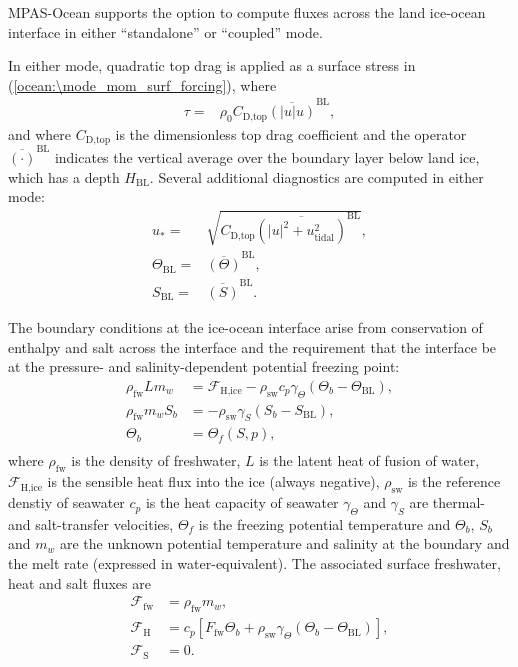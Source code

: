 MPAS-Ocean supports the option to compute fluxes across
the land ice-ocean interface in either ``standalone'' or ``coupled''
mode.

In either mode, quadratic top drag is applied as a surface stress
in (\ref{ocean:\mode_mom_surf_forcing}), where
\begin{align}
\tau = & \rho_0 C_\textrm{D,top} \overline{\left(|u| u\right)}^\textrm{BL},
\end{align}
and where $C_\textrm{D,top}$ is the dimensionless top drag coefficient
and the operator $\overline{\left(\cdot\right)}^\textrm{BL}$ indicates
the vertical average over the boundary layer below land ice, which
has a depth $H_\textrm{BL}$.  Several additional diagnostics are computed
in either mode:
\begin{align}
u_* = & \sqrt{C_\textrm{D,top} \overline{\left(|u|^2+u_\textrm{tidal}^2\right)}^\textrm{BL}}, \\
\Theta_\textrm{BL} = & \overline{\left(\Theta\right)}^\textrm{BL}, \\
S_\textrm{BL} = & \overline{\left(S\right)}^\textrm{BL}.
\end{align}

The boundary conditions at the ice-ocean interface arise
from conservation of enthalpy and salt across the interface and the requirement that the interface
be at the pressure- and salinity-dependent potential freezing point:
\begin{align}
  \rho_\textrm{fw} L m_w & = \mathcal{F}_\textrm{H,ice} - \rho_\textrm{sw} c_p \gamma_\Theta \left(\Theta_b - \Theta_\textrm{BL} \right), \label{ocean:\mode_land_ice_enthalpy_balance}\\
  \rho_\textrm{fw} m_w S_b & = - \rho_\textrm{sw} \gamma_S \left(S_b - S_\textrm{BL}\right),  \\
  \Theta_b & = \Theta_f(S,p), \\
\end{align}
where $\rho_\textrm{fw}$ is the density of freshwater, $L$ is the latent heat of fusion of
water, $\mathcal{F}_\textrm{H,ice}$ is the sensible heat flux into the ice (always negative),
$\rho_\textrm{sw}$ is the reference denstiy of seawater $c_p$ is the heat capacity of seawater
$\gamma_\Theta$ and $\gamma_S$ are thermal- and salt-transfer velocities,
$\Theta_f$ is the freezing potential temperature and $\Theta_b$, $S_b$ and $m_w$ are the
unknown potential temperature and salinity at the boundary and the melt rate (expressed in
water-equivalent).  The associated surface freshwater, heat and salt fluxes are
\begin{align}
  \mathcal{F}_\textrm{fw} & = \rho_\textrm{fw} m_w, \\
  \mathcal{F}_\textrm{H} & = c_p \left[F_\textrm{fw} \Theta_b + \rho_\textrm{sw} \gamma_\Theta \left(\Theta_b - \Theta_\textrm{BL}\right)\right], \\
  \mathcal{F}_\textrm{S} & = 0.
\end{align}


